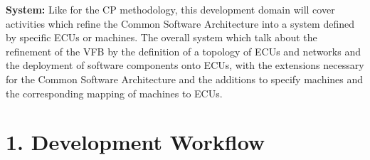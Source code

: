  {\bfseries System\+:} Like for the CP methodology, this development domain will cover activities which refine the Common Software Architecture into a system defined by specific E\+C\+Us or machines. The overall system which talk about the refinement of the V\+FB by the definition of a topology of E\+C\+Us and networks and the deployment of software components onto E\+C\+Us, with the extensions necessary for the Common Software Architecture and the additions to specify machines and the corresponding mapping of machines to E\+C\+Us.

\section*{1. Development Workflow}



\tabulinesep=1mm
